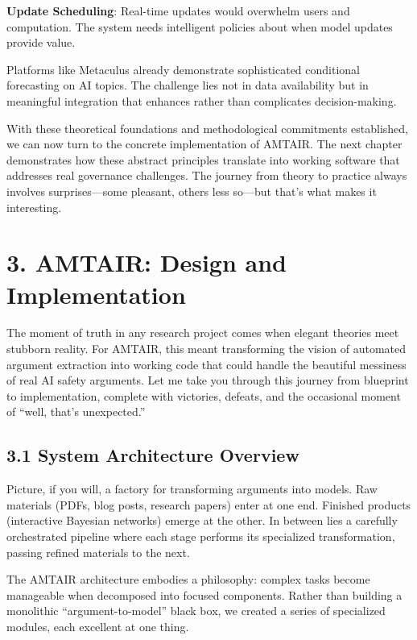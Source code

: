 \documentclass[
  11pt,
  letterpaper,
]{book}
\begin{document}
\textbf{Update Scheduling}: Real-time updates would overwhelm users and
computation. The system needs intelligent policies about when model
updates provide value.

Platforms like Metaculus \textcite{tetlock2022} already demonstrate
sophisticated conditional forecasting on AI topics. The challenge lies
not in data availability but in meaningful integration that enhances
rather than complicates decision-making.

With these theoretical foundations and methodological commitments
established, we can now turn to the concrete implementation of AMTAIR.
The next chapter demonstrates how these abstract principles translate
into working software that addresses real governance challenges. The
journey from theory to practice always involves surprises---some
pleasant, others less so---but that's what makes it interesting.


\chapter{3. AMTAIR: Design and Implementation}\label{sec-amtair}

The moment of truth in any research project comes when elegant theories
meet stubborn reality. For AMTAIR, this meant transforming the vision of
automated argument extraction into working code that could handle the
beautiful messiness of real AI safety arguments. Let me take you through
this journey from blueprint to implementation, complete with victories,
defeats, and the occasional moment of ``well, that's unexpected.''

\section{3.1 System Architecture
Overview}\label{sec-system-architecture}

Picture, if you will, a factory for transforming arguments into models.
Raw materials (PDFs, blog posts, research papers) enter at one end.
Finished products (interactive Bayesian networks) emerge at the other.
In between lies a carefully orchestrated pipeline where each stage
performs its specialized transformation, passing refined materials to
the next.

The AMTAIR architecture embodies a philosophy: complex tasks become
manageable when decomposed into focused components. Rather than building
a monolithic ``argument-to-model'' black box, we created a series of
specialized modules, each excellent at one thing.
\end{document}
